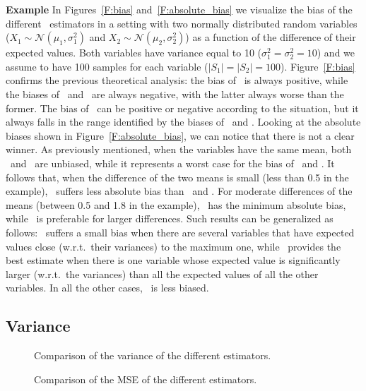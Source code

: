 \textbf{Example} In Figures~\ref{F:bias} and~\ref{F:absolute_bias} we visualize the bias of the different \MEV~estimators in a setting with two normally distributed random variables ($X_1\sim\mathcal{N}(\mu_1,\sigma_1^2)$ and $X_2\sim\mathcal{N}(\mu_2,\sigma_2^2)$) as a function of the difference of their expected values. Both variables have variance equal to 10 ($\sigma_1^2=\sigma_2^2=10$) and we assume to have 100 samples for each variable ($|S_1|=|S_2|=100$).
Figure~\ref{F:bias} confirms the previous theoretical analysis: the bias of \ME~is always positive, while the biases of \OWE~and \CV~are always negative, with the latter always worse than the former.
The bias of \WE~can be positive or negative according to the situation, but it always falls in the range identified by the biases of \ME~and \CV. 
Looking at the absolute biases shown in Figure~\ref{F:absolute_bias}, we can notice that there is not a clear winner.
As previously mentioned, when the variables have the same mean, both \CV~and \OWE~are unbiased, while it represents a worst case for the bias of \ME~and \WE. It follows that, when the difference of the two means is small (less than 0.5 in the example), \CV~suffers less absolute bias than \ME~and \WE. For moderate differences of the means (between 0.5 and 1.8 in the example), \WE~has the minimum absolute bias, while \ME~is preferable for larger differences.
Such results can be generalized as follows: \CV~suffers a small bias when there are several variables that have expected values close (w.r.t.~their variances) to the maximum one, while \ME~provides the best estimate when there is one variable whose expected value is significantly larger (w.r.t.~the variances) than all the expected values of all the other variables. In all the other cases, \WE~is less biased.

\subsection{Variance}


\begin{figure}
    \begin{minipage}{0.5\textwidth}
    \centering 
    \setlength\figureheight{4cm}
    \setlength\figurewidth{6cm}
     
    \caption{Comparison of the variance of the different estimators.}\label{F:variance}
    \end{minipage}
    \hfill
    \begin{minipage}{0.45\textwidth}
     \centering 
    \setlength\figureheight{4cm}
    \setlength\figurewidth{6cm}
     
    \caption{Comparison of the MSE of the different estimators.}\label{F:mse}
    \end{minipage}
\end{figure}

